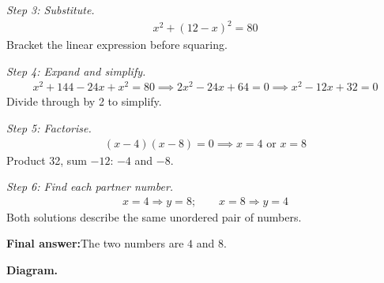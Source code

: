 \documentclass[11pt]{article}
\begin{document}
\textit{Step 3: Substitute.}
\[\begin{gathered}
x^2 + (12 - x)^2 = 80
\end{gathered}\]
Bracket the linear expression before squaring.

\textit{Step 4: Expand and simplify.}
\[\begin{gathered}
x^2 + 144 - 24x + x^2 = 80 \implies 2x^2 - 24x + 64 = 0 \implies x^2 - 12x + 32 = 0
\end{gathered}\]
Divide through by 2 to simplify.

\textit{Step 5: Factorise.}
\[\begin{gathered}
(x - 4)(x - 8) = 0 \implies x = 4 \text{ or } x = 8
\end{gathered}\]
Product 32, sum \( -12 \): \( -4 \) and \( -8 \).

\textit{Step 6: Find each partner number.}
\[\begin{gathered}
x = 4 \Rightarrow y = 8; \qquad x = 8 \Rightarrow y = 4
\end{gathered}\]
Both solutions describe the same unordered pair of numbers.

\begin{answerbox}
\textbf{Final answer:}\quad The two numbers are \(\displaystyle 4\) and \(\displaystyle 8\).
\end{answerbox}
\textbf{Diagram.}
\end{document}
